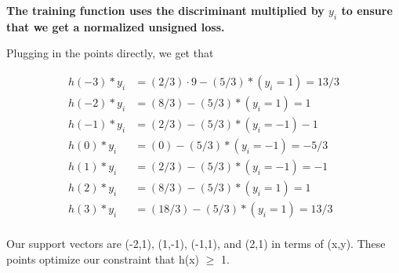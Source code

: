 \documentclass[submit]{harvardml}
\newenvironment{answer}{%
    \color{answergreen}\bf}
  {%
  }
\begin{document}
\begin{enumerate}
\begin{answer}
    The training function uses the discriminant multiplied by $y_i$ to ensure that we get a normalized unsigned loss.

    Plugging in the points directly, we get that 

    \begin{align*}
        h(-3)*y_i &= (2/3)\cdot 9 - (5/3) * (y_i = 1)  =  13/3 \\
        h(-2)*y_i &= (8/3) - (5/3)  * (y_i = 1)  = 1 \\
        h(-1)*y_i &= (2/3) - (5/3) * (y_i = -1)    -1 \\
        h(0)*y_i &= (0) - (5/3) * (y_i = -1) = -5/3 \\
        h(1)*y_i &= (2/3) - (5/3) * (y_i = -1)  =  -1 \\
        h(2)*y_i &= (8/3) - (5/3) * (y_i = 1)  =  1 \\
        h(3)*y_i &= (18/3) - (5/3) * (y_i = 1)  =  13/3 \\
    \end{align*}

    Our support vectors are (-2,1), (1,-1),  (-1,1), and (2,1) in terms of (x,y). These points
    optimize our constraint that h(x) $\geq$ 1.




\end{answer}

    \end{enumerate}
\newpage
\end{document}
